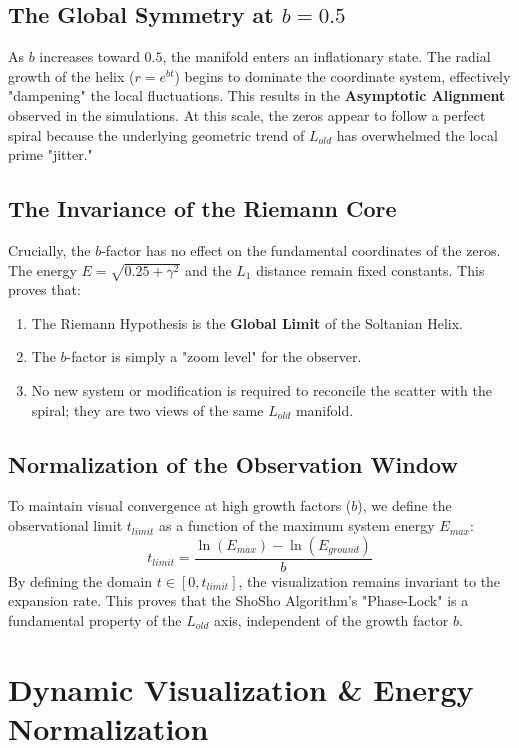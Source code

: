 \documentclass[11pt,a4paper]{article}
\begin{document}
\subsection{The Global Symmetry at $b=0.5$}
As $b$ increases toward $0.5$, the manifold enters an inflationary state. The radial growth of the helix ($r = e^{bt}$) begins to dominate the coordinate system, effectively "dampening" the local fluctuations. This results in the \textbf{Asymptotic Alignment} observed in the simulations. At this scale, the zeros appear to follow a perfect spiral because the underlying geometric trend of $L_{old}$ has overwhelmed the local prime "jitter."

\subsection{The Invariance of the Riemann Core}
Crucially, the $b$-factor has no effect on the fundamental coordinates of the zeros. The energy $E = \sqrt{0.25 + \gamma^2}$ and the $L_1$ distance remain fixed constants. This proves that:
\begin{enumerate}
    \item The Riemann Hypothesis is the \textbf{Global Limit} of the Soltanian Helix.
    \item The $b$-factor is simply a "zoom level" for the observer.
    \item No new system or modification is required to reconcile the scatter with the spiral; they are two views of the same $L_{old}$ manifold.
\end{enumerate}

\subsection{Normalization of the Observation Window}
To maintain visual convergence at high growth factors ($b$), we define the observational limit $t_{limit}$ as a function of the maximum system energy $E_{max}$:
\begin{equation}
    t_{limit} = \frac{\ln(E_{max}) - \ln(E_{ground})}{b}
\end{equation}
By defining the domain $t \in [0, t_{limit}]$, the visualization remains invariant to the expansion rate. This proves that the ShoSho Algorithm's "Phase-Lock" is a fundamental property of the $L_{old}$ axis, independent of the growth factor $b$.\\

\section{Dynamic Visualization \& Energy Normalization}
\end{document}
